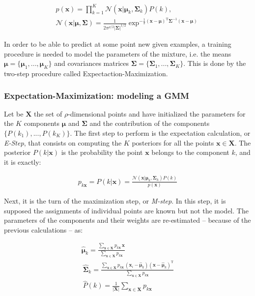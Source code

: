 \documentclass[10pt,twocolumn,letterpaper]{article}
\begin{document}
\begin{gather}
	p(\mathbf{x}) = \prod_{k=1}^{K} \mathcal{N}(\mathbf{x}|\boldsymbol{\mu}_{k}, \mathbf{\Sigma}_{k}) P(k), \\
	\mathcal{N}(\mathbf{x}|\boldsymbol{\mu},\mathbf{\Sigma}) = \frac{1}{2\pi^{\rho/2}|\mathbf{\Sigma}|^{1/2}} \exp^{-\frac{1}{2} (\mathbf{x}-\boldsymbol{\mu})^\mathrm{T} \mathbf{\Sigma}^{-1} (\mathbf{x}-\boldsymbol{\mu}) }
\end{gather}

In order to be able to predict at some point new given examples, a training procedure is needed to model the parameters of the mixture, i.e. the means $\boldsymbol{\mu} = \{ \mathbf{\boldsymbol{\mu}}_1, ..., \boldsymbol{\mu}_K \}$ and covariances matrices $\mathbf{\Sigma} = \{ \mathbf{\Sigma}_1, ..., \mathbf{\Sigma}_K \}$. This is done by the two-step procedure called Expectaction-Maximization.

\subsubsection{Expectation-Maximization: modeling a GMM}

Let be $\mathbf{X}$ the set of $\rho$-dimensional points and have initialized the parameters for the $K$ components $\boldsymbol{\mu}$ and $\mathbf{\Sigma}$ and the contribution of the components $\{P(k_1), ..., P(k_K)\}$. The first step to perform is the expectation calculation, or \emph{E-Step}, that consists on computing the $K$ posteriors for all the points $\mathbf{x} \in \mathbf{X}$. The posterior $P(k|\mathbf{x})$ is the probability the point $\mathbf{x}$ belongs to the component $k$, and it is exactly:

\begin{gather}
	p_{k\mathbf{x}} = P(k|\mathbf{x}) = \frac{\mathcal{N}(\mathbf{x}|\boldsymbol{\mu}_{k}, \mathbf{\Sigma}_{k}) P(k)}{p(\mathbf{x})}
\end{gather}

Next, it is the turn of the maximization step, or \emph{M-step}. In this step, it is supposed the assignments of individual points are known but not the model. The parameters of the components and their weights are re-estimated -- because of the previous calculations -- as:

\begin{gather}
	\hat{\boldsymbol{\mu}}_k = \frac{\sum_{\mathbf{x} \in \mathbf{X}} p_{k\mathbf{x}} \, \mathbf{x}}{\sum_{\mathbf{x} \in \mathbf{X}} p_{k\mathbf{x}}} \\
	~
	\hat{\mathbf{\Sigma}}_k = \frac{\sum_{\mathbf{x} \in \mathbf{X}} p_{k\mathbf{x}} \, (\mathbf{x}_i - \hat{\boldsymbol{\mu}}_k)(\mathbf{x} - \hat{\boldsymbol{\mu}}_k)^{\mathrm{T}} }{\sum_{\mathbf{x} \in \mathbf{X}} p_{k\mathbf{x}}}\\
	~
	\hat{P}(k) = \frac{1}{|\mathbf{X}|} \sum_{\mathbf{x} \in \mathbf{X}} p_{k\mathbf{x}}
\end{gather}
\end{document}
